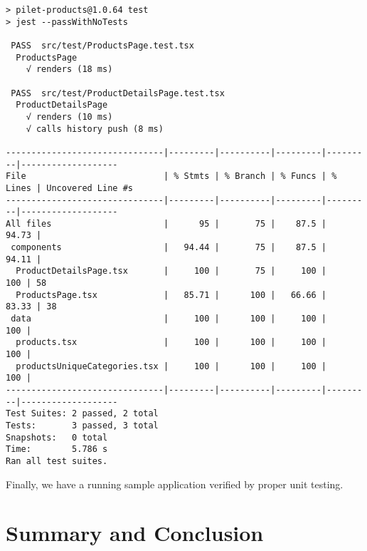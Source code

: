 \documentclass[a4paper]{book}
\begin{document}
\begin{lstlisting}[caption={pilet-products unit testing results}]
> pilet-products@1.0.64 test
> jest --passWithNoTests    

 PASS  src/test/ProductsPage.test.tsx
  ProductsPage
    √ renders (18 ms)

 PASS  src/test/ProductDetailsPage.test.tsx
  ProductDetailsPage
    √ renders (10 ms)
    √ calls history push (8 ms)

-------------------------------|---------|----------|---------|---------|-------------------
File                           | % Stmts | % Branch | % Funcs | % Lines | Uncovered Line #s
-------------------------------|---------|----------|---------|---------|-------------------
All files                      |      95 |       75 |    87.5 |   94.73 |
 components                    |   94.44 |       75 |    87.5 |   94.11 |
  ProductDetailsPage.tsx       |     100 |       75 |     100 |     100 | 58
  ProductsPage.tsx             |   85.71 |      100 |   66.66 |   83.33 | 38
 data                          |     100 |      100 |     100 |     100 |
  products.tsx                 |     100 |      100 |     100 |     100 |
  productsUniqueCategories.tsx |     100 |      100 |     100 |     100 |
-------------------------------|---------|----------|---------|---------|-------------------
Test Suites: 2 passed, 2 total
Tests:       3 passed, 3 total
Snapshots:   0 total
Time:        5.786 s
Ran all test suites.

\end{lstlisting}

Finally, we have a running sample application verified by proper unit testing.



\chapter{Summary and Conclusion}
\end{document}
